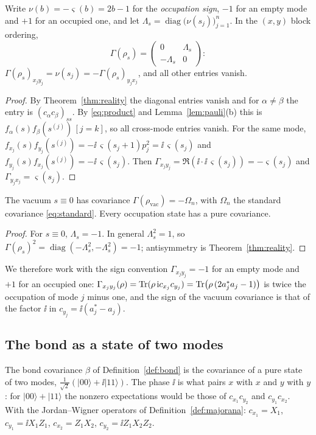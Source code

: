 \begin{theorem}\label{thm:occupation}
Write $\nu(b)=-\varsigma(b)=2b-1$ for the \emph{occupation sign}, $-1$ for an empty mode and $+1$
for an occupied one, and let $\Lambda_s=\operatorname{diag}\bigl(\nu(s_j)\bigr)_{j=1}^n$. In the $(x,y)$ block
ordering,
\[
 \Gamma(\rho_s)=\begin{pmatrix}0&\Lambda_s\\-\Lambda_s&0\end{pmatrix}:
\]
$\Gamma(\rho_s)_{x_jy_j}=\nu(s_j)=-\Gamma(\rho_s)_{y_jx_j}$, and all other entries
vanish.
\end{theorem}
\begin{proof}
By Theorem~\ref{thm:reality} the diagonal entries vanish and for $\alpha\neq\beta$ the
entry is $(c_\alpha c_\beta)_{ss}$. By \eqref{eq:product} and Lemma~\ref{lem:pauli}(b) this is
$f_\alpha(s)f_\beta(s^{(j)})\,[j=k]$, so all cross-mode entries vanish. For the same mode,
$f_{x_j}(s)f_{y_j}(s^{(j)})=-\ii\,\varsigma(s_j+1)p_j^2=\ii\,\varsigma(s_j)$ and
$f_{y_j}(s)f_{x_j}(s^{(j)})=-\ii\,\varsigma(s_j)$. Then
$\Gamma_{x_jy_j}=\Re(\ii\cdot\ii\,\varsigma(s_j))=-\varsigma(s_j)$ and $\Gamma_{y_jx_j}=\varsigma(s_j)$.
\end{proof}

\begin{corollary}\label{cor:vacuum}
The vacuum $s\equiv0$ has covariance $\Gamma(\rho_{\mathrm{vac}})=-\Omega_n$, with $\Omega_n$ the
standard covariance \eqref{eq:standard}. Every occupation state has a pure covariance.
\end{corollary}
\begin{proof}
For $s\equiv0$, $\Lambda_s=-1$. In general $\Lambda_s^2=1$, so
$\Gamma(\rho_s)^2=\operatorname{diag}(-\Lambda_s^2,-\Lambda_s^2)=-1$; antisymmetry is
Theorem~\ref{thm:reality}.
\end{proof}
We therefore work with the sign convention $\Gamma_{x_jy_j}=-1$ for an empty mode and
$+1$ for an occupied one: $\Gamma_{x_jy_j}(\rho)=\operatorname{Tr}(\rho\,\mathrm i c_{x_j}c_{y_j})=\operatorname{Tr}\bigl(\rho\,(2a_j^*a_j-1)\bigr)$
is twice the occupation of mode $j$ minus one, and the sign of the vacuum covariance is that
of the factor $\ii$ in $c_{y_j}=\ii(a_j^*-a_j)$.

\subsection{The bond as a state of two modes}
The bond covariance $\beta$ of Definition~\ref{def:bond} is the covariance of a
pure state of two modes, $\tfrac1{\sqrt2}(|00\rangle+\ii|11\rangle)$. The phase $\ii$ is what
pairs $x$ with $x$ and $y$ with $y$: for $|00\rangle+|11\rangle$ the nonzero expectations
would be those of $c_{x_1}c_{y_2}$ and $c_{y_1}c_{x_2}$. With the Jordan--Wigner operators
of Definition~\ref{def:majorana}:
$c_{x_1}=X_1$, $c_{y_1}=\ii X_1Z_1$, $c_{x_2}=Z_1X_2$, $c_{y_2}=\ii Z_1X_2Z_2$.

